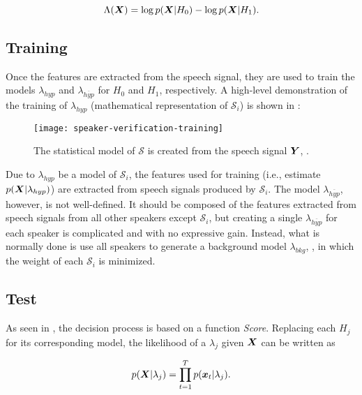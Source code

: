 \begin{equation}
    \Lambda(\dvec{X}) = \log \postpdf{\dvec{X}}{H_0} - \log \postpdf{\dvec{X}}{H_1}.
    \label{eq:log-likelihood-ratio-test}
\end{equation}

\subsection{Training}

Once the features are extracted from the speech signal, they are used to train the models $\lambda_{hyp}$ and $\lambda_{\overline{hyp}}$ for $H_0$ and $H_1$, respectively. A high-level demonstration of the training of $\lambda_{hyp}$ (mathematical representation of $\mathcal{S}_i$) is shown in :

\begin{figure}[ht]
    \centering
    \texttt{[image: speaker-verification-training]}
    \caption{The statistical model of $\mathcal{S}$ is created from the speech signal $\boldsymbol{Y}$, .}
    \label{fig:speaker-verification-training}
\end{figure}

Due to $\lambda_{hyp}$ be a model of $\mathcal{S}_i$, the features used for training (i.e., estimate $p(\boldsymbol{X}|\lambda_{hyp})$) are extracted from speech signals produced by $\mathcal{S}_i$. The model $\lambda_{\overline{hyp}}$, however, is not well-defined. It should be composed of the features extracted from speech signals from all other speakers except $\mathcal{S}_i$, but creating a single $\lambda_{\overline{hyp}}$ for each speaker is complicated and with no expressive gain. Instead, what is normally done is use all speakers to generate a background model $\lambda_{bkg}$, , in which the weight of each $\mathcal{S}_i$ is minimized.

\subsection{Test}

As seen in , the decision process is based on a function \emph{Score}. Replacing each $H_j$ for its corresponding model, the likelihood of a $\lambda_j$ given $\boldsymbol{X}$ can be written as

\begin{equation}
    p(\dvec{X}|\lambda_j) = \prod_{t=1}^T p(\dvec{x}_t|\lambda_j).
    \label{eq:likelihood-prod}
\end{equation}

